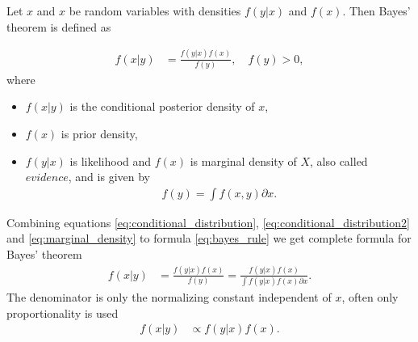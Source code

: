     \begin{definition}
    Let $x$ and $x$ be random variables with densities $f(y|x)$ and $f(x)$. Then Bayes' theorem is defined as
    \end{definition}
    \begin{align}
        f(x|y) &= \frac{f(y|x) f(x)}{f(y)}, \quad f(y) > 0,\label{eq:bayes_rule}
    \end{align}
where 
    \begin{itemize}
        \item $f(x|y) $ is the conditional posterior density of $x$,
        \item $f(x)$ is prior density,
        \item  $f(y|x)$ is likelihood and $f(x)$ is marginal density of $X$, also called $evidence$, and is given by 
            \begin{align}
            f(y) = \int f(x,y) \partial x \label{eq:marginal_density}.
            \end{align}
    \end{itemize}
    
Combining equations \ref{eq:conditional_distribution}, \ref{eq:conditional_distribution2} and \ref{eq:marginal_density} to formula \ref{eq:bayes_rule} we get complete formula for Bayes' theorem
    \begin{align}
        f(x|y) &= \frac{f(y|x) f(x)}{f(y)} = \frac{f(y|x) f(x)}{\int f(y|x) f(x) \partial x}. \label{eq:bayes_full}
    \end{align}
The denominator is only the normalizing constant independent of $x$, often only proportionality is used
    \begin{align}
        f(x|y) &\propto f(y|x)f(x).
    \end{align}











    
